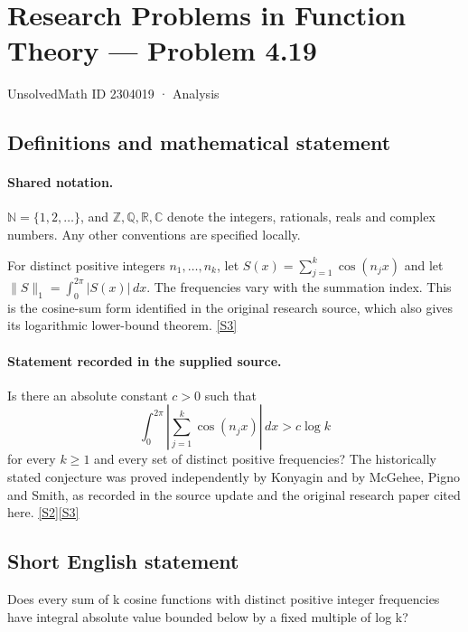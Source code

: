\documentclass[11pt]{book}
\newcommand{\sref}[2]{\hyperlink{source:#1:#2}{[S#2]}}
\begin{document}
\setcounter{section}{2304018}
\section{Research Problems in Function Theory — Problem 4.19}\label{2304019}
{\small\sffamily UnsolvedMath ID 2304019 · Analysis}
\subsection{Definitions and mathematical statement}

\paragraph{Shared notation.}$\mathbb N=\{1,2,\ldots\}$, and $\mathbb Z,\mathbb Q,\mathbb R,\mathbb C$ denote the integers, rationals, reals and complex numbers. Any other conventions are specified locally.


For distinct positive integers $n_1,\ldots,n_k$, let $S(x)=\sum_{j=1}^k\cos(n_jx)$ and let $\|S\|_1=\int_0^{2\pi}|S(x)|\,dx$. The frequencies vary with the summation index. This is the cosine-sum form identified in the original research source, which also gives its logarithmic lower-bound theorem. \sref{2304019}{3}
\paragraph{Statement recorded in the supplied source.}
Is there an absolute constant $c>0$ such that
\[\int_0^{2\pi}\left|\sum_{j=1}^k\cos(n_jx)\right|\,dx>c\log k\]
for every $k\ge1$ and every set of distinct positive frequencies? The historically stated conjecture was proved independently by Konyagin and by McGehee, Pigno and Smith, as recorded in the source update and the original research paper cited here. \sref{2304019}{2}\sref{2304019}{3}
\subsection{Short English statement}
Does every sum of k cosine functions with distinct positive integer frequencies have integral absolute value bounded below by a fixed multiple of log k?
\end{document}
